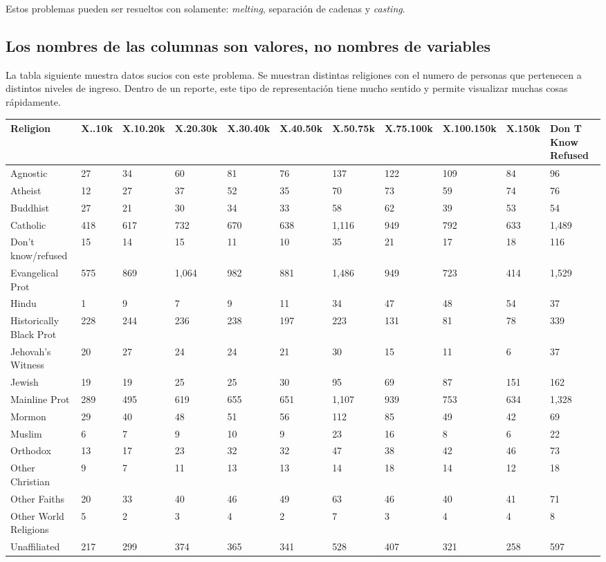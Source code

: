 \documentclass[]{article}
\begin{document}
Estos problemas pueden ser resueltos con solamente: \emph{melting},
separación de cadenas y \emph{casting}.

\subsection{Los nombres de las columnas son valores, no nombres de
variables}\label{los-nombres-de-las-columnas-son-valores-no-nombres-de-variables}

La tabla siguiente muestra datos sucios con este problema. Se muestran
distintas religiones con el numero de personas que pertenecen a
distintos niveles de ingreso. Dentro de un reporte, este tipo de
representación tiene mucho sentido y permite visualizar muchas cosas
rápidamente.

\begin{table}[ht]
\centering
{\tiny
\begin{tabular}{lllllllllll}
  \hline
Religion & X..10k & X.10.20k & X.20.30k & X.30.40k & X.40.50k & X.50.75k & X.75.100k & X.100.150k & X.150k & Don T Know Refused \\ 
  \hline
Agnostic & 27 & 34 & 60 & 81 & 76 & 137 & 122 & 109 & 84 & 96 \\ 
  Atheist & 12 & 27 & 37 & 52 & 35 & 70 & 73 & 59 & 74 & 76 \\ 
  Buddhist & 27 & 21 & 30 & 34 & 33 & 58 & 62 & 39 & 53 & 54 \\ 
  Catholic & 418 & 617 & 732 & 670 & 638 & 1,116 & 949 & 792 & 633 & 1,489 \\ 
  Don’t know/refused & 15 & 14 & 15 & 11 & 10 & 35 & 21 & 17 & 18 & 116 \\ 
  Evangelical Prot & 575 & 869 & 1,064 & 982 & 881 & 1,486 & 949 & 723 & 414 & 1,529 \\ 
  Hindu & 1 & 9 & 7 & 9 & 11 & 34 & 47 & 48 & 54 & 37 \\ 
  Historically Black Prot & 228 & 244 & 236 & 238 & 197 & 223 & 131 & 81 & 78 & 339 \\ 
  Jehovah's Witness & 20 & 27 & 24 & 24 & 21 & 30 & 15 & 11 & 6 & 37 \\ 
  Jewish & 19 & 19 & 25 & 25 & 30 & 95 & 69 & 87 & 151 & 162 \\ 
  Mainline Prot & 289 & 495 & 619 & 655 & 651 & 1,107 & 939 & 753 & 634 & 1,328 \\ 
  Mormon & 29 & 40 & 48 & 51 & 56 & 112 & 85 & 49 & 42 & 69 \\ 
  Muslim & 6 & 7 & 9 & 10 & 9 & 23 & 16 & 8 & 6 & 22 \\ 
  Orthodox & 13 & 17 & 23 & 32 & 32 & 47 & 38 & 42 & 46 & 73 \\ 
  Other Christian & 9 & 7 & 11 & 13 & 13 & 14 & 18 & 14 & 12 & 18 \\ 
  Other Faiths & 20 & 33 & 40 & 46 & 49 & 63 & 46 & 40 & 41 & 71 \\ 
  Other World Religions & 5 & 2 & 3 & 4 & 2 & 7 & 3 & 4 & 4 & 8 \\ 
  Unaffiliated & 217 & 299 & 374 & 365 & 341 & 528 & 407 & 321 & 258 & 597 \\ 
   \hline
\end{tabular}
}
\end{table}
\end{document}
